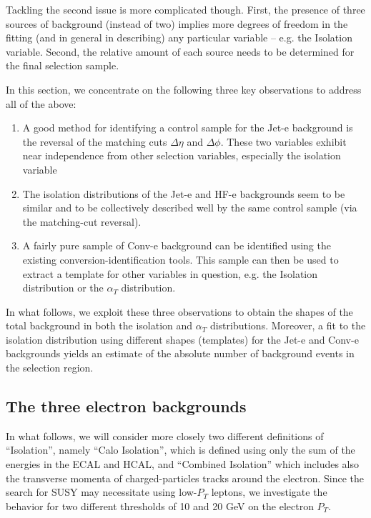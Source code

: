 Tackling the second issue is more complicated though. First, the presence of three sources of background (instead of two) implies more degrees of freedom in the fitting (and in general in describing) any particular variable -- e.g. the Isolation variable. Second, the relative amount of each source needs to be determined for the final selection sample.

In this section, we concentrate on the following three key observations to address all of the above:
\begin{enumerate}
\item A good method for identifying a control sample for the Jet-e background is the reversal of the matching cuts $\Delta\eta$ and $\Delta\phi$.  These two variables exhibit near independence from other selection variables, especially the isolation variable
\item The isolation distributions of the Jet-e and HF-e backgrounds seem to be similar and to be collectively described well by the same control sample (via the matching-cut reversal).
\item A fairly pure sample of Conv-e background can be identified using the existing conversion-identification tools. This sample can then be used to extract a template for other variables in question, e.g. the Isolation distribution or the $\alpha_T$ distribution.
\end{enumerate}
In what follows, we exploit these three observations to obtain the shapes of the total background in both the isolation and $\alpha_T$ distributions.  Moreover, a fit to the isolation distribution using different shapes (templates) for the Jet-e and Conv-e backgrounds yields an estimate of the absolute number of background events in the selection region.

\subsection{The three electron backgrounds}

In what follows, we will consider more closely two different definitions of ``Isolation'', namely ``Calo Isolation'', which is defined using only the sum of the energies in the ECAL and HCAL, and ``Combined Isolation'' which includes also the transverse momenta of charged-particles tracks around the electron.  Since the search for SUSY may necessitate using low-$P_T$ leptons, we investigate the behavior for two different thresholds of 10 and 20 GeV on the electron $P_T$.

